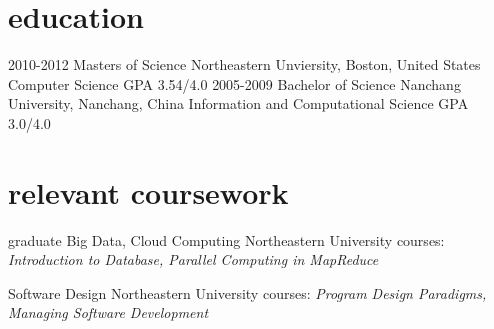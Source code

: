 \documentclass[]{ly-cv} %
\begin{document}
\section{education}
\begin{entrylist}
\entry
{2010-2012}
{Masters of Science} 
{Northeastern Unviersity, Boston, United States}
{Computer Science \hspace{4mm} \footnotesize{GPA 3.54/4.0}}
\entry
{2005-2009}
{Bachelor of Science}
{Nanchang University, Nanchang, China} 
{Information and Computational Science \hspace{4mm} \footnotesize{GPA 3.0/4.0}}
\end{entrylist}
\section{relevant coursework}
\begin{entrylist}
\entry
{graduate}
{Big Data, Cloud Computing}
{Northeastern University}
{courses: \emph{Introduction to Database, Parallel Computing in MapReduce}\vspace*{4pt}}
\end{entrylist}
\begin{entrylist}
\entry
{}
{Software Design}
{Northeastern University}
{courses: \emph{Program Design Paradigms, Managing Software Development}\vspace*{4pt}}
\end{entrylist}
\end{document}

